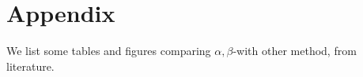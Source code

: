 \section*{Appendix}

We list some tables and figures comparing $\alpha,\beta$-with other method, from literature. 


%
%
%
%
%
%
%	
%	
